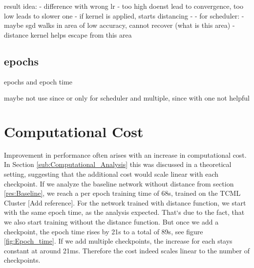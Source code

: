 result idea:
- difference with wrong lr
- too high doenst lead to convergence, too low leads to slower one
- if kernel is applied, starts distancing
- 
-
for scheduler:
- maybe sgd walks in area of low accuracy, cannot recover (what is this area)
- distance kernel helps escape from this area


\subsection{epochs}\label{res:Epochs}
epochs and epoch time

maybe not use since or only for scheduler and multiple, since with one not helpful

\section{Computational Cost}\label{Res:Computational_cost}

Improvement in performance often arises with an increase in computational cost.
In Section \ref{sub:Computational_Analysis} this was discussed in a theoretical
setting, suggesting that the additional cost would scale linear with each
checkpoint. If we analyze the baseline network without distance from section
\ref{res:Baseline}, we reach a per epoch training time of 68s, trained on the
TCML Cluster [Add reference]. For the network trained with distance function, we
start with the same epoch time, as the analysis expected. That`s due to the
fact, that we also start training without the distance function. But once we add
a checkpoint, the epoch time rises by 21s to a total of 89s, see figure
\ref{fig:Epoch_time}. If we add multiple checkpoints, the increase for each
stays constant at around 21ms. Therefore the cost indeed scales linear to the
number of checkpoints.

